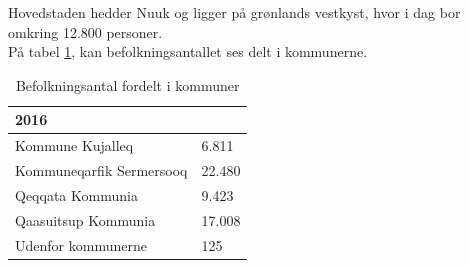 Hovedstaden hedder Nuuk og ligger på grønlands vestkyst, hvor i dag bor omkring 12.800 personer.\\
På tabel \ref{tab:befolkning}, kan befolkningsantallet ses delt i kommunerne.
\newpage
\begin{table}[h]
\centering
    \begin{tabular}{|l|l|}
    \hline
    2016                     & ~      \\ \hline
    Kommune Kujalleq         & 6.811  \\ \hline
    Kommuneqarfik Sermersooq & 22.480 \\ \hline
    Qeqqata Kommunia         & 9.423  \\ \hline
    Qaasuitsup Kommunia      & 17.008 \\ \hline
    Udenfor kommunerne       & 125    \\ \hline
    \end{tabular}
    \caption{Befolkningsantal fordelt i kommuner}
    \label{tab:befolkning}
\end{table}

